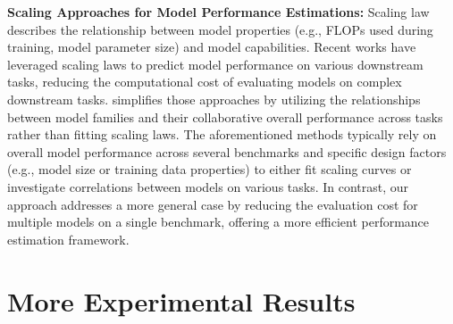 \textbf{Scaling Approaches for Model Performance Estimations:} 
Scaling law describes the relationship between model properties (e.g., FLOPs used during training, model parameter size) and model capabilities. 
Recent works \citep{hu2023predicting, ruan2024observational, isik2024scaling} have leveraged scaling laws to predict model performance on various downstream tasks, reducing the computational cost of evaluating models on complex downstream tasks. \cite{zhang2024collaborative} simplifies those approaches by utilizing the relationships between model families and their collaborative overall performance across tasks rather than fitting scaling laws. The aforementioned methods typically rely on overall model performance across several benchmarks and specific design factors (e.g., model size or training data properties) to either fit scaling curves or investigate correlations between models on various tasks. In contrast, our approach addresses a more general case by reducing the evaluation cost for multiple models on a single benchmark, offering a more efficient performance estimation framework.

\section{More Experimental Results}

